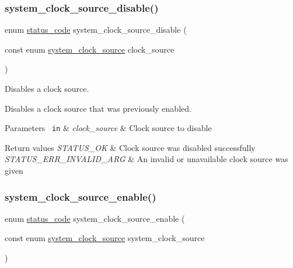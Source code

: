 \subsubsection{\texorpdfstring{system\_clock\_source\_disable()}{system\_clock\_source\_disable()}}
{\footnotesize\ttfamily enum \mbox{\hyperlink{group__group__sam0__utils__status__codes_ga751c892e5a46b8e7d282085a5a5bf151}{status\+\_\+code}} system\+\_\+clock\+\_\+source\+\_\+disable (\begin{DoxyParamCaption}\item[{const enum \mbox{\hyperlink{group__asfdoc__sam0__system__clock__group_ga86882dc960f2552722e9713da97fcc58}{system\+\_\+clock\+\_\+source}}}]{clock\+\_\+source }\end{DoxyParamCaption})}



Disables a clock source. 

Disables a clock source that was previously enabled.


\begin{DoxyParams}[1]{Parameters}
\mbox{\texttt{ in}}  & {\em clock\+\_\+source} & Clock source to disable\\
\hline
\end{DoxyParams}

\begin{DoxyRetVals}{Return values}
{\em S\+T\+A\+T\+U\+S\+\_\+\+OK} & Clock source was disabled successfully \\
\hline
{\em S\+T\+A\+T\+U\+S\+\_\+\+E\+R\+R\+\_\+\+I\+N\+V\+A\+L\+I\+D\+\_\+\+A\+RG} & An invalid or unavailable clock source was given \\
\hline
\end{DoxyRetVals}
\mbox{\label{group__asfdoc__sam0__system__clock__group_gad1e70dd9d08ec72e6a1cbef848ff8189}} 
\subsubsection{\texorpdfstring{system\_clock\_source\_enable()}{system\_clock\_source\_enable()}}
{\footnotesize\ttfamily enum \mbox{\hyperlink{group__group__sam0__utils__status__codes_ga751c892e5a46b8e7d282085a5a5bf151}{status\+\_\+code}} system\+\_\+clock\+\_\+source\+\_\+enable (\begin{DoxyParamCaption}\item[{const enum \mbox{\hyperlink{group__asfdoc__sam0__system__clock__group_ga86882dc960f2552722e9713da97fcc58}{system\+\_\+clock\+\_\+source}}}]{system\+\_\+clock\+\_\+source }\end{DoxyParamCaption})}

